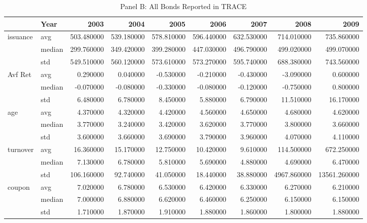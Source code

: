 \documentclass{article}
\begin{document}
\begin{landscape}
\begin{table}[ht]
\end{table}

\begin{table}[ht]
\centering
\caption{Panel B: All Bonds Reported in TRACE}

\begin{tabular}{llrrrrrrr}
\toprule
 & Year & 2003 & 2004 & 2005 & 2006 & 2007 & 2008 & 2009 \\
\midrule
\multirow[t]{3}{*}{issuance} & avg & 503.480000 & 539.180000 & 578.810000 & 596.440000 & 632.530000 & 714.010000 & 735.860000 \\
 & median & 299.760000 & 349.420000 & 399.280000 & 447.030000 & 496.790000 & 499.020000 & 499.070000 \\
 & std & 549.510000 & 560.120000 & 573.610000 & 573.270000 & 595.740000 & 688.380000 & 743.560000 \\
\cline{1-9}
\multirow[t]{3}{*}{Avf Ret} & avg & 0.290000 & 0.040000 & -0.530000 & -0.210000 & -0.430000 & -3.090000 & 0.600000 \\
 & median & -0.070000 & -0.080000 & -0.330000 & -0.080000 & -0.120000 & -0.750000 & 0.800000 \\
 & std & 6.480000 & 6.780000 & 8.450000 & 5.880000 & 6.790000 & 11.510000 & 16.170000 \\
\cline{1-9}
\multirow[t]{3}{*}{age} & avg & 4.370000 & 4.320000 & 4.420000 & 4.560000 & 4.650000 & 4.680000 & 4.620000 \\
 & median & 3.770000 & 3.240000 & 3.420000 & 3.620000 & 3.770000 & 3.800000 & 3.660000 \\
 & std & 3.600000 & 3.660000 & 3.690000 & 3.790000 & 3.960000 & 4.070000 & 4.110000 \\
\cline{1-9}
\multirow[t]{3}{*}{turnover} & avg & 16.360000 & 15.170000 & 12.750000 & 10.420000 & 9.610000 & 114.500000 & 672.250000 \\
 & median & 7.130000 & 6.780000 & 5.810000 & 5.690000 & 4.880000 & 4.690000 & 6.470000 \\
 & std & 106.160000 & 92.740000 & 41.050000 & 18.440000 & 38.880000 & 4967.860000 & 13561.260000 \\
\cline{1-9}
\multirow[t]{3}{*}{coupon} & avg & 7.020000 & 6.780000 & 6.530000 & 6.420000 & 6.330000 & 6.270000 & 6.210000 \\
 & median & 7.000000 & 6.880000 & 6.620000 & 6.460000 & 6.250000 & 6.150000 & 6.150000 \\
 & std & 1.710000 & 1.870000 & 1.910000 & 1.880000 & 1.860000 & 1.800000 & 1.880000 \\

\end{tabular}
\end{table}
\end{landscape}
\end{document}
